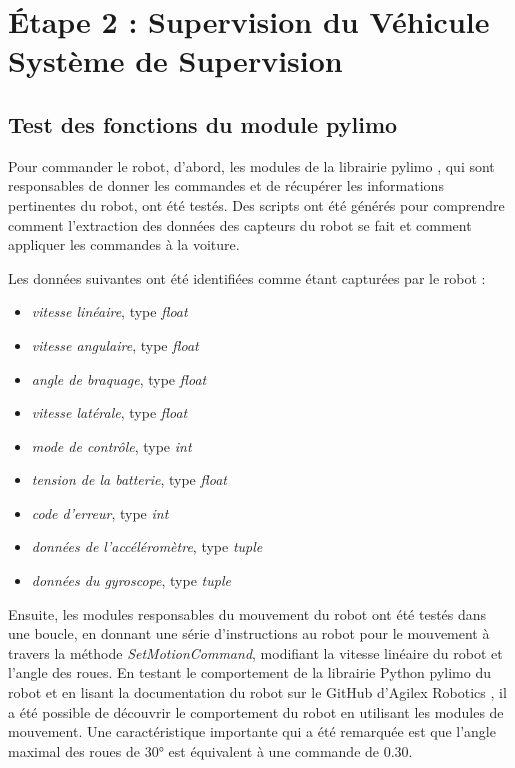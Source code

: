 

\section{Étape 2 : Supervision du Véhicule
Système de Supervision}

\subsection{Test des fonctions du module pylimo}

Pour commander le robot, d'abord, les modules de la librairie pylimo \cite{pylimo}, qui sont responsables de donner les commandes et de récupérer les informations pertinentes du robot, ont été testés. Des scripts ont été générés pour comprendre comment l'extraction des données des capteurs du robot se fait et comment appliquer les commandes à la voiture.

Les données suivantes ont été identifiées comme étant capturées par le robot :

\begin{itemize}
    \item \textit{vitesse linéaire}, type \textit{float}
    \item \textit{vitesse angulaire}, type \textit{float}
    \item \textit{angle de braquage}, type \textit{float}
    \item \textit{vitesse latérale}, type \textit{float}
    \item \textit{mode de contrôle}, type \textit{int}
    \item \textit{tension de la batterie}, type \textit{float}
    \item \textit{code d'erreur}, type \textit{int}
    \item \textit{données de l'accéléromètre}, type \textit{tuple}
    \item \textit{données du gyroscope}, type \textit{tuple}
\end{itemize}

Ensuite, les modules responsables du mouvement du robot ont été testés dans une boucle, en donnant une série d'instructions au robot pour le mouvement à travers la méthode \textit{SetMotionCommand}, modifiant la vitesse linéaire du robot et l'angle des roues. En testant le comportement de la librairie Python pylimo du robot et en lisant la documentation du robot sur le GitHub d'Agilex Robotics \cite{LimoDocGitHub}, il a été possible de découvrir le comportement du robot en utilisant les modules de mouvement. Une caractéristique importante qui a été remarquée est que l'angle maximal des roues de 30° est équivalent à une commande de 0.30.

